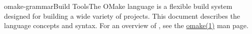%
%
%
\begin{Name}{1}{omake-grammar}{\authors}{Build Tools}{The OMake language}
   is a flexible build system designed for building a wide variety of projects.
  This document describes the language concepts and syntax.
  For an overview of , see the \href{omake.html}{omake(1)} man page.
\end{Name}

